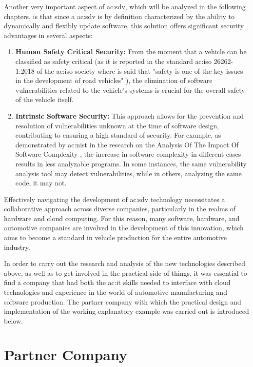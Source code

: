 Another very important aspect of \gls{ac:sdv}, which will be analyzed in the following chapters, is that since a \gls{ac:sdv} is by definition characterized by the ability to dynamically and flexibly update software, this solution offers significant security advantages in several aspects:
\begin{enumerate}
  \item \textbf{Human Safety Critical Security:} From the moment that a vehicle can be classified as safety critical (as it is reported in the standard \gls{ac:iso} 26262-1:2018 of the \gls{ac:iso} society where is said that "safety is one of the key issues in the development of road vehicles" \cite{ISO26262}), the elimination of software vulnerabilities related to the vehicle's systems is crucial for the overall safety of the vehicle itself.  
  \item \textbf{Intrinsic Software Security:} This approach allows for the prevention and resolution of vulnerabilities unknown at the time of software design, contributing to ensuring a high standard of security. For example, as demonstrated by \gls{ac:nist} in the research on the Analysis Of The Impact Of Software Complexity \cite{NISTCodeComplexity}, the increase in software complexity in different cases results in less analyzable programs. In some instances, the same vulnerability analysis tool may detect vulnerabilities, while in others, analyzing the same code, it may not. 
\end{enumerate}

Effectively navigating the development of \gls{ac:sdv} technology necessitates a collaborative approach across diverse companies, particularly in the realms of hardware and cloud computing. For this reason, many software, hardware, and automotive companies are involved in the development of this innovation, which aims to become a standard in vehicle production for the entire automotive industry.

In order to carry out the research and analysis of the new technologies described above, as well as to get involved in the practical side of things, it was essential to find a company that had both the \gls{ac:it} skills needed to interface with cloud technologies and experience in the world of automotive manufacturing and software production. The partner company with which the practical design and implementation of the working explanatory example was carried out is introduced below.
\section{Partner Company}

